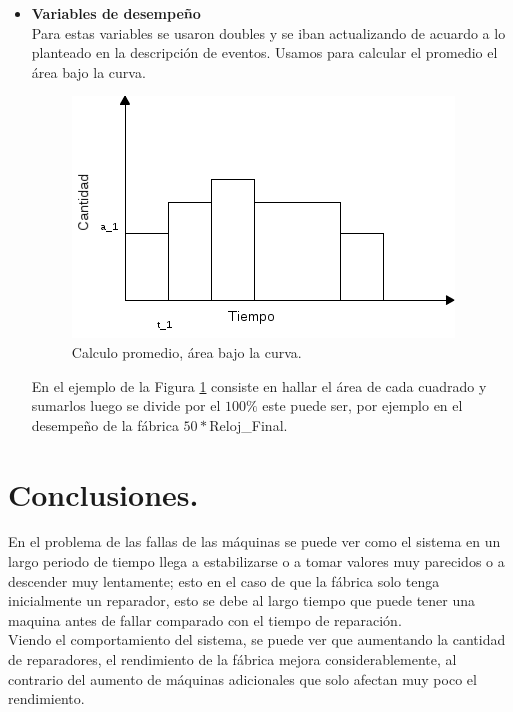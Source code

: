 \documentclass[12pt]{article}
\begin{document}
\begin{itemize}
 	 \item \textbf{Variables de desempeño}\\
 	 Para estas variables se usaron doubles y se iban actualizando de acuardo a lo planteado en la descripción de eventos. Usamos para calcular el promedio el área bajo la curva.
 	 
 	 \begin{figure}
 	  	\centering
 	   		\includegraphics[scale=0.5]{promedio.png} 
     	\caption{Calculo promedio, \'area bajo la curva.}
  		\label{fig:promedios}
 	 \end{figure}
 	 
 	 En el ejemplo de la Figura \ref{fig:promedios} consiste en hallar el área de cada cuadrado y sumarlos luego se divide por el $100\%$ este puede ser, por ejemplo en el desempeño de la f\'abrica  $50*$Reloj\_Final.
 	 
\end{itemize}


\section{Conclusiones.}

En el problema de las fallas de las máquinas se puede ver como el sistema en un largo periodo de tiempo llega a estabilizarse o a tomar valores muy parecidos o a descender muy lentamente; esto en el caso de que la fábrica solo tenga inicialmente un reparador, esto se debe al largo tiempo que puede tener una maquina antes de fallar comparado con el tiempo de reparación.\\

Viendo el comportamiento del sistema, se puede ver que aumentando la cantidad de reparadores, el rendimiento de la fábrica mejora considerablemente, al contrario del aumento de máquinas adicionales que solo afectan muy poco el rendimiento.\\
\end{document}

